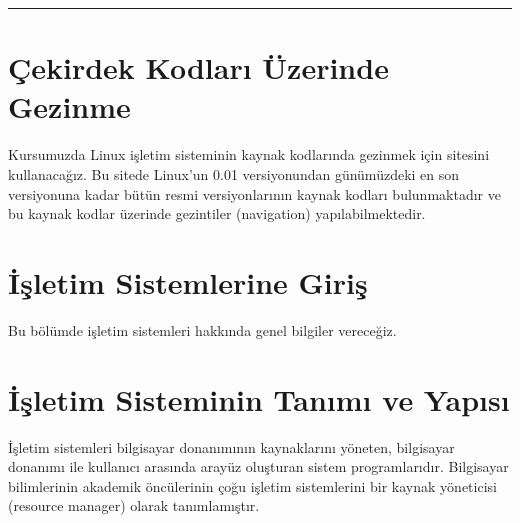 \documentclass[a4paper,10pt,turkish]{sphinxmanual}
\begin{document}
\bigskip\hrule\bigskip



\section{Çekirdek Kodları Üzerinde Gezinme}
\label{\detokenize{introduction:cekirdek-kodlari-uzerinde-gezinme}}
\sphinxAtStartPar
Kursumuzda Linux işletim sisteminin kaynak kodlarında gezinmek için
 sitesini kullanacağız. Bu sitede Linux’un 0.01
versiyonundan günümüzdeki en son versiyonuna kadar bütün resmi versiyonlarının kaynak
kodları bulunmaktadır ve bu kaynak kodlar üzerinde gezintiler (navigation) yapılabilmektedir.


\section{İşletim Sistemlerine Giriş}
\label{\detokenize{introduction:isletim-sistemlerine-giris}}
\sphinxAtStartPar
Bu bölümde işletim sistemleri hakkında genel bilgiler vereceğiz.


\section{İşletim Sisteminin Tanımı ve Yapısı}
\label{\detokenize{introduction:isletim-sisteminin-tanimi-ve-yapisi}}
\sphinxAtStartPar
İşletim sistemleri bilgisayar donanımının kaynaklarını yöneten, bilgisayar donanımı ile
kullanıcı arasında arayüz oluşturan sistem programlarıdır. Bilgisayar bilimlerinin akademik
öncülerinin çoğu işletim sistemlerini bir kaynak yöneticisi (resource manager) olarak
tanımlamıştır.
\end{document}
